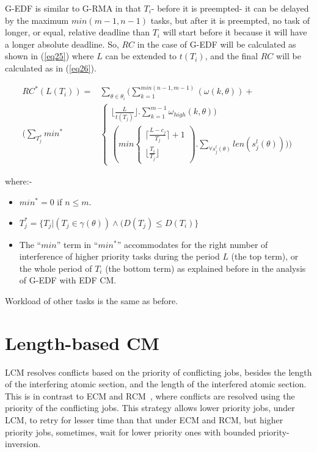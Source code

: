 \documentclass[a4paper,english]{article}
\begin{document}
\textbf{\textit{}}

G-EDF is similar to G-RMA in that $T_{i}$- before it is preempted-
it can be delayed by the maximum $min(m-1,n-1)$ tasks, but after it is preempted, no task of longer, or equal, relative deadline
than $T_{i}$ will start before it because it will have a longer absolute
deadline. So, $RC$ in the case of G-EDF will be calculated
as shown in (\ref{eq25}) where $L$ can be extended to $t(T_{i})$, and the final $RC$ will be calculated as in (\ref{eq26}).

\begin{eqnarray}
RC^{*}(L(T_{i}))= & \sum_{\theta\in\theta_{i}}(\sum_{k=1}^{min(n-1,m-1)}(\omega(k,\theta))+\nonumber \\
(\sum_{T_{j}^{*}}min^* & \begin{cases}
\lfloor\frac{L}{t(T_{j})}\rfloor.\sum_{k=1}^{m-1}\omega_{high}(k,\theta))\\
(min\begin{cases}
\lceil\frac{L-c_{j}}{T_{j}}\rceil+1\\
\lfloor\frac{T_{i}}{T_{j}}\rfloor\end{cases}).\sum_{\forall s_{j}^{l}(\theta)}len(s_{j}^{l}(\theta))))\end{cases}\label{eq25}\end{eqnarray}

where:-
\begin{itemize}
\item $min^* =0$ if $n\le m$.
\item $T_{j}^{*}=\{T_{j}|(T_{j}\in\gamma(\theta))\wedge(D(T_{j})\le D(T_{i})\}$
\item The ``$min$'' term in ``$min^{*}$'' accommodates for the right number of interference of higher priority tasks during the period $L$ (the top term), or the whole period of $T_i$ (the bottom term) as explained before in the analysis of G-EDF with EDF CM.
\end{itemize}

Workload of other tasks is the same as before.


\section{Length-based CM}

LCM resolves conflicts based on the priority of conflicting jobs, besides the length of the interfering atomic section, and the length of the interfered atomic section. This is in contrast to ECM and RCM~\cite{stmconcurrencycontrol:emsoft11}, where conflicts are resolved using the priority of the conflicting jobs. This strategy allows lower priority jobs, under LCM, to retry for lesser time than that under ECM and RCM, but higher priority jobs, sometimes, wait for lower priority ones with bounded priority-inversion.
\end{document}
